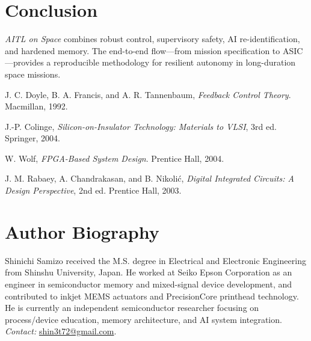 \documentclass[conference]{IEEEtran}
\begin{document}
\section*{Conclusion}
\emph{AITL on Space} combines robust control, supervisory safety, AI
re-identification, and hardened memory. The end-to-end flow—from mission
specification to ASIC—provides a reproducible methodology for resilient
autonomy in long-duration space missions.

\begin{thebibliography}{1}
J. C. Doyle, B. A. Francis, and A. R. Tannenbaum,
\emph{Feedback Control Theory}. Macmillan, 1992.

J.-P. Colinge, \emph{Silicon-on-Insulator Technology: Materials to VLSI},
3rd ed. Springer, 2004.

W. Wolf, \emph{FPGA-Based System Design}. Prentice Hall, 2004.

J. M. Rabaey, A. Chandrakasan, and B. Nikoli\'{c},
\emph{Digital Integrated Circuits: A Design Perspective}, 2nd ed. Prentice Hall, 2003.
\end{thebibliography}

\section*{Author Biography}
Shinichi Samizo received the M.S. degree in Electrical and Electronic
Engineering from Shinshu University, Japan. He worked at Seiko Epson Corporation
as an engineer in semiconductor memory and mixed-signal device development, and
contributed to inkjet MEMS actuators and PrecisionCore printhead technology.
He is currently an independent semiconductor researcher focusing on
process/device education, memory architecture, and AI system integration.\\
\emph{Contact:} \href{mailto:shin3t72@gmail.com}{shin3t72@gmail.com}.
\end{document}
